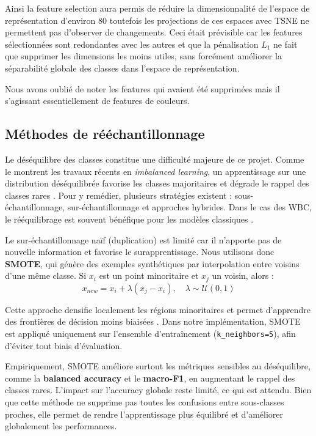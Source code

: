 \documentclass[journal,twocolumn]{IEEEtran}
\begin{document}
Ainsi la feature selection aura permis de réduire la dimensionnalité de l'espace de représentation d'environ 80 toutefois les projections de ces espaces avec TSNE ne permettent pas d'observer de changements. Ceci était prévisible car les features sélectionnées sont redondantes avec les autres et que la pénalisation $L_1$ ne fait que supprimer les dimensions les moins utiles, sans forcément améliorer la séparabilité globale des classes dans l’espace de représentation.

Nous avons oublié de noter les features qui avaient été supprimées mais il s'agissant essentiellement de features de couleurs.


\subsection{Méthodes de rééchantillonnage}

Le déséquilibre des classes constitue une difficulté majeure de ce projet. Comme le montrent les travaux récents en \textit{imbalanced learning}, un apprentissage sur une distribution déséquilibrée favorise les classes majoritaires et dégrade le rappel des classes rares \cite{Gao_2026}. Pour y remédier, plusieurs stratégies existent : sous-échantillonnage, sur-échantillonnage et approches hybrides. Dans le cas des WBC, le rééquilibrage est souvent bénéfique pour les modèles classiques \cite{healthcare10112230}.

Le sur-échantillonnage naïf (duplication) est limité car il n’apporte pas de nouvelle information et favorise le surapprentissage. Nous utilisons donc \textbf{SMOTE}, qui génère des exemples synthétiques par interpolation entre voisins d’une même classe. Si $x_i$ est un point minoritaire et $x_j$ un voisin, alors :
\begin{equation}
 x_{new} = x_i + \lambda (x_j - x_i), \quad \lambda \sim \mathcal{U}(0,1)
\end{equation}

Cette approche densifie localement les régions minoritaires et permet d’apprendre des frontières de décision moins biaisées \cite{Gao_2026}. Dans notre implémentation, SMOTE est appliqué uniquement sur l’ensemble d’entraînement (\texttt{k\_neighbors=5}), afin d’éviter tout biais d’évaluation.

Empiriquement, SMOTE améliore surtout les métriques sensibles au déséquilibre, comme la \textbf{balanced accuracy} et le \textbf{macro-F1}, en augmentant le rappel des classes rares. L’impact sur l’accuracy globale reste limité, ce qui est attendu. Bien que cette méthode ne supprime pas toutes les confusions entre sous-classes proches, elle permet de rendre l’apprentissage plus équilibré et d’améliorer globalement les performances.
\end{document}
